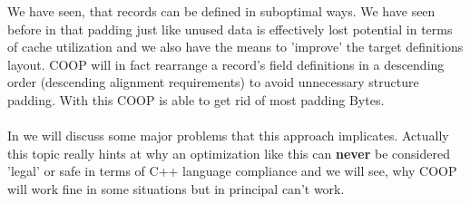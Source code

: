 We have seen, that records can be defined in suboptimal ways. We have seen before in  that padding just like unused data is effectively lost potential in terms of cache utilization and we also have the means to 'improve' the target definitions layout. COOP will in fact rearrange a record's field definitions in a descending order (descending alignment requirements) to avoid unnecessary structure padding. With this COOP is able to get rid of most padding Bytes.\\\\
In  we will discuss some major problems that this approach implicates. Actually this topic really hints at why an optimization like this can \textbf{never} be considered 'legal' or safe in terms of C++ language compliance and we will see, why COOP will work fine in some situations but in principal can't work.




